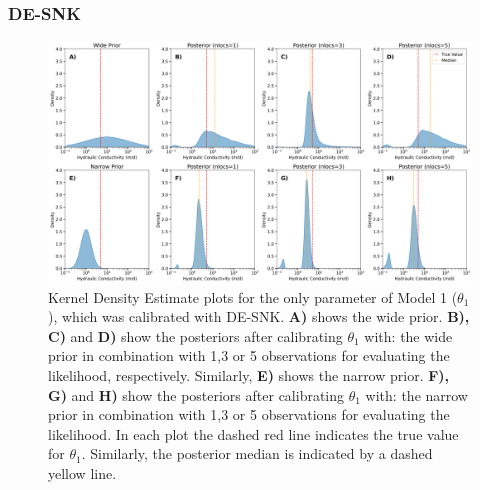 \subsubsection{DE-SNK}\label{sub_DE-SNK}
\begin{figure}[ht]
\centering
\includegraphics[width=1.0\textwidth]{Figures/kde_model1_DEsnooker.png}
\caption{Kernel Density Estimate plots for the only parameter of Model 1 ($\theta_1$), which was calibrated with DE-SNK. \textbf{A)} shows the wide prior. \textbf{B), C)} and \textbf{D)} show the posteriors after calibrating $\theta_1$ with: the wide prior in combination with 1,3 or 5 observations for evaluating the likelihood, respectively. Similarly, \textbf{E)} shows the narrow prior. \textbf{F), G)} and \textbf{H)} show the posteriors after calibrating $\theta_1$ with: the narrow prior in combination with 1,3 or 5 observations for evaluating the likelihood. In each plot the dashed red line indicates the true value for $\theta_1$. Similarly, the posterior median is indicated by a dashed yellow line.}\label{fig_kde_model1_DEsnooker_app}
\end{figure}

